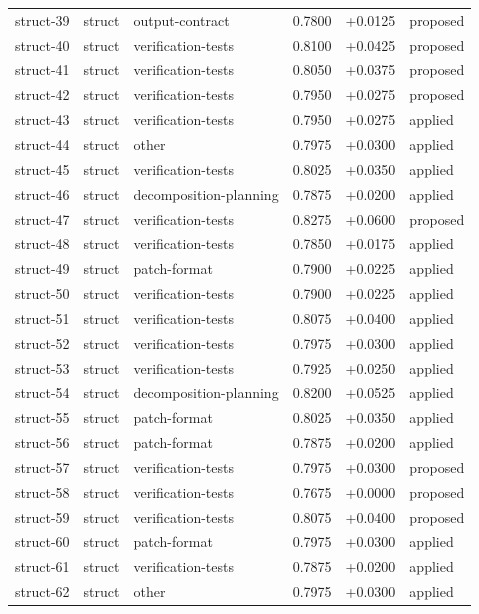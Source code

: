 \begin{center}
\begin{longtable}{llp{5.2cm}rrl}
struct-39 & struct & output-contract & 0.7800 & +0.0125 & proposed \\
struct-40 & struct & verification-tests & 0.8100 & +0.0425 & proposed \\
struct-41 & struct & verification-tests & 0.8050 & +0.0375 & proposed \\
struct-42 & struct & verification-tests & 0.7950 & +0.0275 & proposed \\
struct-43 & struct & verification-tests & 0.7950 & +0.0275 & applied \\
struct-44 & struct & other & 0.7975 & +0.0300 & applied \\
struct-45 & struct & verification-tests & 0.8025 & +0.0350 & applied \\
struct-46 & struct & decomposition-planning & 0.7875 & +0.0200 & applied \\
struct-47 & struct & verification-tests & 0.8275 & +0.0600 & proposed \\
struct-48 & struct & verification-tests & 0.7850 & +0.0175 & applied \\
struct-49 & struct & patch-format & 0.7900 & +0.0225 & applied \\
struct-50 & struct & verification-tests & 0.7900 & +0.0225 & applied \\
struct-51 & struct & verification-tests & 0.8075 & +0.0400 & applied \\
struct-52 & struct & verification-tests & 0.7975 & +0.0300 & applied \\
struct-53 & struct & verification-tests & 0.7925 & +0.0250 & applied \\
struct-54 & struct & decomposition-planning & 0.8200 & +0.0525 & applied \\
struct-55 & struct & patch-format & 0.8025 & +0.0350 & applied \\
struct-56 & struct & patch-format & 0.7875 & +0.0200 & applied \\
struct-57 & struct & verification-tests & 0.7975 & +0.0300 & proposed \\
struct-58 & struct & verification-tests & 0.7675 & +0.0000 & proposed \\
struct-59 & struct & verification-tests & 0.8075 & +0.0400 & proposed \\
struct-60 & struct & patch-format & 0.7975 & +0.0300 & applied \\
struct-61 & struct & verification-tests & 0.7875 & +0.0200 & applied \\
struct-62 & struct & other & 0.7975 & +0.0300 & applied \\

\end{longtable}
\end{center}
